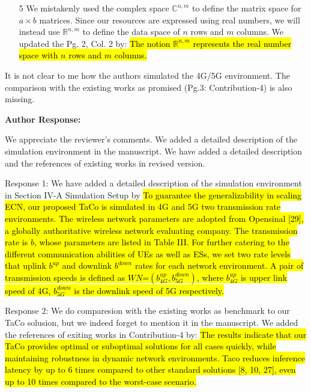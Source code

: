 \documentclass{ar2rc}
\newcommand{\highlight}[1]{\sethlcolor{yellow!50}\hl{#1}}
\begin{document}
\begin{itemize}
	\item[5] We mistakenly used the complex space $\mathbb{C}^{n,m}$ to define the matrix space for $a \times b$ matrices. Since our resources are expressed using real numbers, we will instead use $\mathbb{R}^{n,m}$ to define the data space of $n$ rows and $m$ columns. We updated the Pg. 2, Col. 2 by: \highlight{The notion $\mathbb{R}^{n,m}$ represents the real number space with $n$ rows and $m$ columns.}
\end{itemize}

\begin{tcolorbox}[
   title={Reviewer 1: Comment 2},
   colback=gray!10,%
   colframe=black,%
   width=\linewidth,%
   arc=1mm, auto outer arc,
   boxrule=0.5pt,
]
It is not clear to me how the authors simulated the 4G/5G environment. The comparison with the existing works as promised (Pg.3: Contribution-4) is also missing.
\end{tcolorbox}
\textbf{Author Response:} 

{We appreciate the reviewer's comments. We added a detailed description of the simulation environment in the manuscript. We have added a detailed description and the references of existing works in revised version.}

Response 1: We have added a detailed description of the simulation environment in Section IV-A Simulation Setup by 
\highlight{To guarantee the generalizability in scaling ECN, our proposed TaCo is simulated in 4G and 5G two transmission rate environments. The wireless network parameters are adopted from Opensinal [29], a globally authoritative wireless network evaluating company. The transmission rate is $b$, whose parameters are listed in Table III. For further catering to the different communication abilities of UEs as well as ESs, we set two rate levels that uplink $b^{up}$ and downlink $b^{down}$ rates for each network environment. A pair of transmission speeds is defined as $WN$=$(b_{4G}^{up}, b_{5G}^{down})$, where $b_{4G}^{up}$ is upper link speed of 4G, $b_{5G}^{down}$ is the downlink speed of 5G respectively.} 

Response 2: We do comparesion with the existing works as benchmark to our TaCo solusion, but we indeed forget to mention it in the manuscript. We added the references of exiting works in Contribution-4 by:
\highlight{The results indicate that our TaCo provides optimal or suboptimal solutions for all cases quickly, while maintaining robustness in dynamic network environments. Taco reduces inference latency by up to 6 times compared to other standard solutions [8, 10, 27], even up to 10 times compared to the worst-case scenario.}
\end{document}
